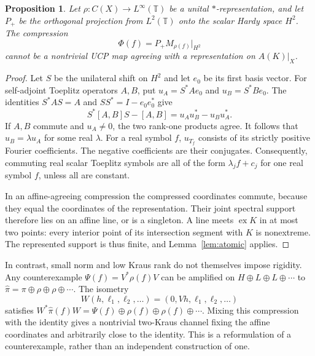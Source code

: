 \documentclass[11pt,letterpaper]{amsart}
\newtheorem{proposition}[theorem]{Proposition}
\theoremstyle{definition}
\theoremstyle{remark}
\numberwithin{equation}{section}
\DeclareMathOperator{\ex}{ex}
\begin{document}
\begin{proposition}\label{nonwalsh:prop:toeplitz}
Let $\rho:C(X)\to L^\infty(\mathbb T)$ be a unital
$*$-representation, and let $P_+$ be the orthogonal projection from
$L^2(\mathbb T)$ onto the scalar Hardy space $H^2$. The compression
\[
                   \Phi(f)=P_+M_{\rho(f)}|_{H^2}
\]
cannot be a nontrivial UCP map agreeing with a representation on
$A(K)|_X$.
\end{proposition}
\begin{proof}
Let $S$ be the unilateral shift on $H^2$ and let $e_0$ be its first
basis vector. For self-adjoint Toeplitz operators $A,B$, put
$u_A=S^*Ae_0$ and $u_B=S^*Be_0$. The identities $S^*AS=A$ and
$SS^*=I-e_0e_0^*$ give
\[
                  S^*[A,B]S-[A,B]=u_Au_B^*-u_Bu_A^*.
\]
If $A,B$ commute and $u_A\ne0$, the two rank-one products agree.
It follows that $u_B=\lambda u_A$ for some real $\lambda$.
For a real symbol $f$, $u_{T_f}$ consists of its strictly positive
Fourier coefficients. The negative coefficients are their conjugates.
Consequently, commuting real scalar Toeplitz symbols are all of the
form $\lambda_jf+c_j$ for one real symbol $f$, unless all are constant.

In an affine-agreeing compression the compressed coordinates commute,
because they equal the coordinates of the representation. Their joint
spectral support therefore lies on an affine line, or is a singleton.
A line meets $\ex K$ in at most two points: every interior point of
its intersection segment with $K$ is nonextreme. The represented
support is thus finite, and Lemma~\ref{lem:atomic} applies.
\end{proof}

In contrast, small norm and low Kraus rank do not themselves impose
rigidity. Any counterexample $\Psi(f)=V^*\rho(f)V$ can be amplified
on $H\oplus L\oplus L\oplus\cdots$ to
$\widehat\pi=\pi\oplus\rho\oplus\rho\oplus\cdots$. The isometry
\[
             W(h,\ell_1,\ell_2,\ldots)=(0,Vh,\ell_1,\ell_2,\ldots)
\]
satisfies
$W^*\widehat\pi(f)W=\Psi(f)\oplus\rho(f)\oplus\rho(f)\oplus\cdots$.
Mixing this compression with the identity gives a nontrivial two-Kraus
channel fixing the affine coordinates and arbitrarily close to the
identity. This is a reformulation of a counterexample, rather than an
independent construction of one.
\end{document}

